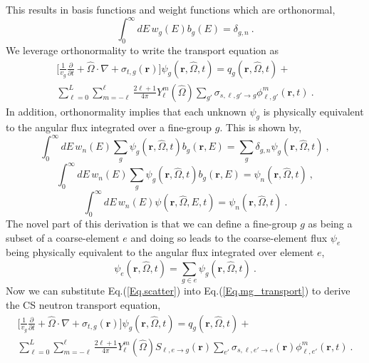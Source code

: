 \documentclass{anstrans}
\renewcommand{\vec}[1]{\bm{#1}} %
\begin{document}
This results in basis functions and weight functions which are orthonormal, 
\begin{equation*}
\int_0^\infty dE \, w_g(E) b_g(E) = \delta_{g,n} \: .
\end{equation*} 
We leverage orthonormality to write the transport equation as 
\begin{multline}
\label{Eq.mg_transport}
\Bigg[\frac{1}{v_g} \frac{\partial}{\partial t} + \hat{\Omega} \cdot \nabla + \sigma_{t,g}(\vec{r}) \Bigg] \psi_g(\vec{r},\hat{\Omega},t)  = q_g(\vec{r},\hat{\Omega},t) + \\ \sum_{\ell=0}^L \sum_{m=-\ell}^\ell \frac{2 \ell + 1}{4 \pi} Y_\ell^m(\hat{\Omega}) \sum_{g'} \sigma_{s,\ell, g' \to g}  \phi_{\ell,g'}^m(\vec{r},t) \: .
\end{multline} 
In addition, orthonormality implies that each unknown $\psi_g$ is physically equivalent to the angular flux integrated over a fine-group $g$. This is shown by,
\begin{equation*}
\int_0^\infty dE \, w_n(E) \sum_g \psi_g(\vec{r},\hat{\Omega},t) b_g(\vec{r},E)  = \sum_g \delta_{g,n} \psi_g(\vec{r},\hat{\Omega},t) \: ,
\end{equation*}
\begin{equation*}
\int_0^\infty dE \, w_n(E) \sum_g \psi_g(\vec{r},\hat{\Omega},t) b_g(\vec{r},E)  = \psi_n(\vec{r},\hat{\Omega},t) \: ,
\end{equation*}
\begin{equation*}
\int_0^\infty dE \, w_n(E) \psi(\vec{r},\hat{\Omega},E, t) = \psi_n(\vec{r},\hat{\Omega},t) \: .
\end{equation*}
The novel part of this derivation is that we can define a fine-group $g$ as being a subset of a coarse-element $e$ and doing so leads to the coarse-element flux $\psi_e$ being physically equivalent to the angular flux integrated over element $e$,
\begin{equation*}
\psi_e(\vec{r},\hat{\Omega},t) = \sum_{g \in e} \psi_g(\vec{r},\hat{\Omega},t) \:. 
\end{equation*}
Now we can substitute Eq.(\ref{Eq.scatter}) into Eq.(\ref{Eq.mg_transport}) to derive the CS neutron transport equation, 
\begin{multline*}
\label{Eq.CS}
\Bigg[\frac{1}{v_g} \frac{\partial}{\partial t} + \hat{\Omega} \cdot \nabla + \sigma_{t,g}(\vec{r}) \Bigg] \psi_g(\vec{r},\hat{\Omega},t)  = q_g(\vec{r},\hat{\Omega},t) + \\ \sum_{\ell=0}^L \sum_{m=-\ell}^\ell \frac{2 \ell + 1}{4 \pi} Y_\ell^m(\hat{\Omega}) S_{\ell,e\to g}(\vec{r}) \sum_{e'} \sigma_{s,\ell,e'\to e}(\vec{r}) \phi_{\ell,e'}^m(\vec{r},t) \: .
\end{multline*}
\end{document}
